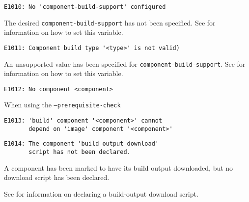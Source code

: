 \begin{footnotesize}
\begin{verbatim}
E1010: No 'component-build-support' configured
\end{verbatim}
\end{footnotesize}

The desired \texttt{component-build-support} has not been specified.
See  for information on how to
set this variable.

\begin{footnotesize}
\begin{verbatim}
E1011: Component build type '<type>' is not valid)
\end{verbatim}
\end{footnotesize}

An unsupported value has been specified for
\texttt{component-build-support}.  See
 for information on how to set
this variable.

\begin{footnotesize}
\begin{verbatim}
E1012: No component <component>
\end{verbatim}
\end{footnotesize}

When using the \texttt{--prerequisite-check}

\begin{footnotesize}
\begin{verbatim}
E1013: 'build' component '<component>' cannot
       depend on 'image' component '<component>'
\end{verbatim}
\end{footnotesize}


\begin{footnotesize}
\begin{verbatim}
E1014: The component 'build output download'
       script has not been declared.
\end{verbatim}
\end{footnotesize}

A component has been marked to have its build output downloaded, but
no download script has been declared.

See  for
information on declaring a build-output download script.

